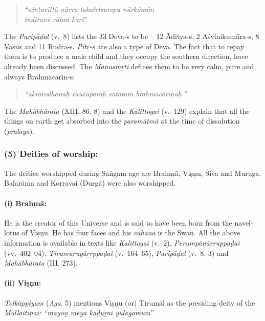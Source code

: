 \begin{quote}
\textit{“aintavittā ṉāṟṟa lakalvisumpu ṉārkōmāṉ}\\\textit{indiranē cāluṅ kari}”
\end{quote}

The \textit{Paripāḍal} (v.~8) lists the 33 Deva-s to be – 12 Āditya-s, 2 Aśvinikumāra-s, 8 Vasūs and 11 Rudra-s. \textit{Pitṛ-s} are also a type of Deva. The fact that to repay them is to produce a male child and they occupy the southern direction, have already been discussed. The \textit{Maṇusmṛti} defines them to be very calm, pure and always Brahmacārin-s:

\begin{quote}
\textit{“akrarodhanāḥ caucaparāḥ satatam brahmacāriṇaḥ }”
\end{quote}

The \textit{Mahābhārata} (XIII. 86. 8) and the \textit{Kalittogai} (v.~129) explain that all the things on earth get absorbed into the \textit{paramātmā} at the time of dissolution (\textit{pralaya}).


\subsubsection*{(5) Deities of worship:}

\vskip -6pt

The deities worshipped during Saṅgam age are Brahmā, Viṣṇu, Śiva and Muruga. Balarāma and Koṟṟavai (Durgā) were also worshipped.

\paragraph*{(i) Brahmā:}

\vskip -6pt

He is the creator of this Universe and is said to have been born from the navel-lotus of Viṣṇu. He has four faces and his \textit{vāhana} is the Swan. All the above information is available in texts like \textit{Kalittogai} (v.~2), \textit{Perumpāṇāṟṟuppaḍai} (vv.~402–04), \textit{Tirumurugāṟṟppaḍai} (v.~164–65), \textit{Paripāḍal} (v.~8. 3) and \textit{Mahābhārata} (III. 273).


\paragraph*{(ii) Viṣṇu:}

\vskip -6pt

\textit{Tolkāppiyam} (\textit{Aga}. 5) mentions Viṣṇu (or) Tirumāl as the presiding deity of the \textit{Mullaitiṇai: “māyōṉ mēya kāḍuṟai yulagamum}”

